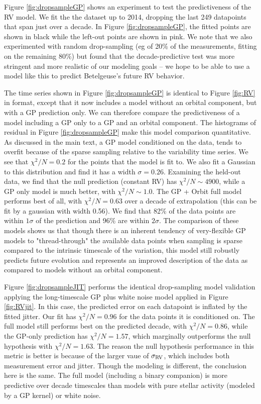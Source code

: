 \documentclass[twocolumn]{aastex631}
\begin{document}
Figure \ref{fig:dropsampleGP} shows an experiment to test the predictiveness of the RV model. We fit the the dataset up to 2014, dropping the last 249 datapoints that span just over a decade. In Figure \ref{fig:dropsampleGP}, the fitted points are shown in black while the left-out points are shown in pink. We note that we also experimented with random drop-sampling (eg of 20\% of the measurements, fitting on the remaining 80\%) but found that the decade-predictive test was more stringent and more realistic of our modeling goals -- we hope to be able to use a model like this to predict Betelgeuse's future RV behavior. 

The time series shown in Figure \ref{fig:dropsampleGP} is identical to Figure \ref{fig:RV} in format, except that it now includes a model without an orbital component, but with a GP prediction only. We can therefore compare the predictiveness of a model including a GP only to a GP and an orbital component. The histograms of residual in Figure \ref{fig:dropsampleGP} make this model comparison quantitative. As discussed in the main text, a GP model conditioned on the data, tends to overfit because of the sparse sampling relative to the variability time series. We see that $\chi^2/N = 0.2$ for the points that the model is fit to. We also fit a Gaussian to this distribution and find it has a width $\sigma = 0.26$.  Examining the held-out data, we find that the null prediction (constant RV) has $\chi^2 / N \sim 4900$, while a GP only model is much better, with $\chi^2/N \sim 1.0$. The GP + Orbit full model performs best of all, with $\chi^2 / N = 0.63$ over a decade of extrapolation (this can be fit by a gaussian with width 0.56). We find that 82\% of the data points are within $1\sigma$ of the prediction and 96\% are within $2\sigma$. The comparison of these models shows us that though there is an inherent tendency of very-flexible GP models to "thread-through" the available data points when sampling is sparse compared to the intrinsic timescale of the variation, this model still robustly predicts future evolution and represents an improved description of the data as compared to models without an orbital component. 

Figure \ref{fig:dropsampleJIT} performs the identical drop-sampling model validation applying the long-timescale GP plus white noise model applied in Figure \ref{fig:RVjit}. In this case, the predicted error on each datapoint is inflated by the fitted jitter. Our fit has $\chi^2/N = 0.96$ for the data points it is conditioned on. The full model still performs best on the predicted decade, with $\chi^2/N = 0.86$, while the GP-only prediction has $\chi^2/N = 1.57$, which marginally outperforms the null hypothesis with $\chi^2/N = 1.63$. The reason the null hypothesis performance in this metric is better is because of the larger vaue of $\sigma_{\rm RV}$, which includes both measurement error and jitter. Though the modeling is different, the conclusion here is the same. The full model (including a binary companion) is more predictive over decade timescales than models with pure stellar activity (modeled by a GP kernel) or white noise. 
\end{document}
